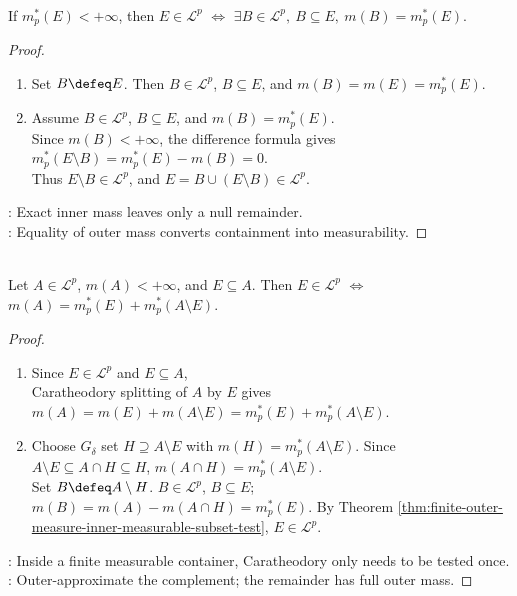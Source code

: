 \begin{theorem} \label{thm:finite-outer-measure-inner-measurable-subset-test} \\
If $m_p^\ast(E)<+\infty$, then $E\in\mathcal{L}^p$ $\Longleftrightarrow$ $\exists B\in\mathcal{L}^p,\ B\subseteq E,\ m(B)=m_p^\ast(E)$.
\begin{proof}
\begin{enumerate}[label=\roman*.]
\setlength{\itemsep}{0pt}
\item[$(\Rightarrow)$] Set $B\defeq E$. Then $B\in\mathcal{L}^p$, $B\subseteq E$, and $m(B)=m(E)=m_p^\ast(E)$.
\item[$(\Leftarrow)$] Assume $B\in\mathcal{L}^p$, $B\subseteq E$, and $m(B)=m_p^\ast(E)$.\\
Since $m(B)<+\infty$, the difference formula gives $m_p^\ast(E\setminus B)=m_p^\ast(E)-m(B)=0$.\\
Thus $E\setminus B\in\mathcal{L}^p$, and $E=B\cup(E\setminus B)\in\mathcal{L}^p$.
\end{enumerate}
: Exact inner mass leaves only a null remainder.\\
: Equality of outer mass converts containment into measurability.
\end{proof}
\end{theorem}

\begin{theorem} \label{thm:single-container-caratheodory-test} \\
Let $A\in\mathcal{L}^p$, $m(A)<+\infty$, and $E\subseteq A$. Then $E\in\mathcal{L}^p$ $\Longleftrightarrow$ $m(A)=m_p^\ast(E)+m_p^\ast(A\setminus E)$.
\begin{proof}
\begin{enumerate}[label=\roman*.]
\setlength{\itemsep}{0pt}
\item[$(\Rightarrow)$] Since $E\in\mathcal{L}^p$ and $E\subseteq A$,\\
Caratheodory splitting of $A$ by $E$ gives $m(A)=m(E)+m(A\setminus E)=m_p^\ast(E)+m_p^\ast(A\setminus E)$.
\item[$(\Leftarrow)$] Choose $G_\delta$ set $H\supseteq A\setminus E$ with $m(H)=m_p^\ast(A\setminus E)$. Since $A\setminus E\subseteq A\cap H\subseteq H$, $m(A\cap H)=m_p^\ast(A\setminus E)$.\\
Set $B\defeq A\setminus H$. $B\in\mathcal{L}^p$, $B\subseteq E$; $m(B)=m(A)-m(A\cap H)=m_p^\ast(E)$. By Theorem \ref{thm:finite-outer-measure-inner-measurable-subset-test}, $E\in\mathcal{L}^p$.
\end{enumerate}
: Inside a finite measurable container, Caratheodory only needs to be tested once.\\
: Outer-approximate the complement; the remainder has full outer mass.
\end{proof}
\end{theorem}

